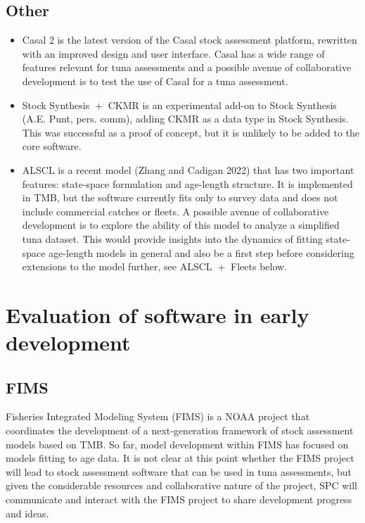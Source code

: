 \documentclass{SCreport}
\begin{document}
\subsection{Other}

\begin{itemize}
  \item Casal 2 is the latest version of the Casal stock assessment platform,
  rewritten with an improved design and user interface. Casal has a wide range
  of features relevant for tuna assessments and a possible avenue of
  collaborative development is to test the use of Casal for a tuna assessment.
  \item Stock Synthesis $\!+\!$ CKMR is an experimental add-on to Stock
  Synthesis (A.E. Punt, pers. comm), adding CKMR as a data type in Stock
  Synthesis. This was successful as a proof of concept, but it is unlikely to be
  added to the core software.
  \item ALSCL is a recent model (Zhang and Cadigan 2022) that has two important
  features: state-space formulation and age-length structure. It is implemented
  in TMB, but the software currently fits only to survey data and does not
  include commercial catches or fleets. A possible avenue of collaborative
  development is to explore the ability of this model to analyze a simplified
  tuna dataset. This would provide insights into the dynamics of fitting
  state-space age-length models in general and also be a first step before
  considering extensions to the model further, see ALSCL $\!+\!$ Fleets below.
\end{itemize}

\section{Evaluation of software in early development}
\label{sec:software-early-development}

\subsection{FIMS}

Fisheries Integrated Modeling System (FIMS) is a NOAA project that coordinates
the development of a next-generation framework of stock assessment models based
on TMB. So far, model development within FIMS has focused on models fitting to
age data. It is not clear at this point whether the FIMS project will lead to
stock assessment software that can be used in tuna assessments, but given the
considerable resources and collaborative nature of the project, SPC will
communicate and interact with the FIMS project to share development progress and
ideas.
\end{document}
